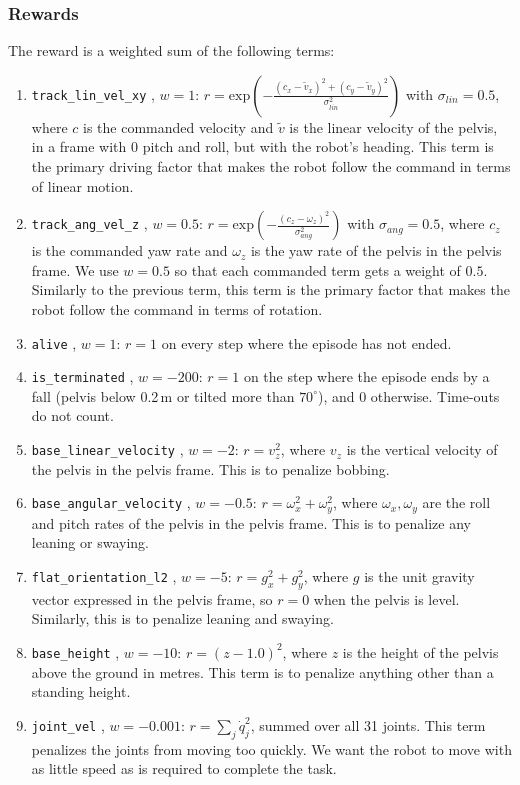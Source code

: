 \documentclass[11pt]{article}
\newcommand{\code}[1]{%
    \colorbox{mdBg}{\textcolor{mdText}{\texttt{#1}}}%
}
\begin{document}
\subsubsection*{Rewards}
The reward is a weighted sum of the following terms:
\begin{enumerate}
    \item \code{track\_lin\_vel\_xy}, $w=1$: $r=\text{exp}(-\frac{(c_x - \tilde v_x)^2+(c_y - \tilde v_y)^2}{\sigma_{lin}^2})$ with $\sigma_{lin}=0.5$, where $c$ is the commanded velocity and $\tilde v$ is the linear velocity of the pelvis, in a frame with 0 pitch and roll, but with the robot's heading. This term is the primary driving factor that makes the robot follow the command in terms of linear motion.
    \item \code{track\_ang\_vel\_z}, $w=0.5$: $r=\text{exp}(-\frac{(c_z - \omega_z)^2}{\sigma_{ang}^2})$ with $\sigma_{ang}=0.5$, where $c_z$ is the commanded yaw rate and $\omega_z$ is the yaw rate of the pelvis in the pelvis frame. We use $w=0.5$ so that each commanded term gets a weight of $0.5$. Similarly to the previous term, this term is the primary factor that makes the robot follow the command in terms of rotation.
    \item \code{alive}, $w=1$: $r=1$ on every step where the episode has not ended.
    \item \code{is\_terminated}, $w=-200$: $r=1$ on the step where the episode ends by a fall (pelvis below 0.2\,m or tilted more than $70^\circ$), and 0 otherwise. Time-outs do not count.
    \item \code{base\_linear\_velocity}, $w=-2$: $r=v_z^2$, where $v_z$ is the vertical velocity of the pelvis in the pelvis frame. This is to penalize bobbing.
    \item \code{base\_angular\_velocity}, $w=-0.5$: $r=\omega_x^2+\omega_y^2$, where $\omega_x, \omega_y$ are the roll and pitch rates of the pelvis in the pelvis frame. This is to penalize any leaning or swaying.
    \item \code{flat\_orientation\_l2}, $w=-5$: $r=g_x^2+g_y^2$, where $g$ is the unit gravity vector expressed in the pelvis frame, so $r=0$ when the pelvis is level. Similarly, this is to penalize leaning and swaying.
    \item \code{base\_height}, $w=-10$: $r=(z-1.0)^2$, where $z$ is the height of the pelvis above the ground in metres. This term is to penalize anything other than a standing height.
    \item \code{joint\_vel}, $w=-0.001$: $r=\sum_j \dot q_j^2$, summed over all 31 joints. This term penalizes the joints from moving too quickly. We want the robot to move with as little speed as is required to complete the task.

\end{enumerate}
\end{document}
